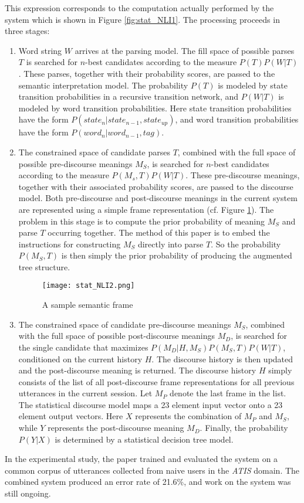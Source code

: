 This expression corresponds to the computation actually performed by the system which is shown in Figure \ref{fig:stat_NLI1}. The processing proceeds in three stages:
\begin{enumerate}
\item Word string $W$ arrives at the parsing model. The fill space of possible parses $T$ is searched for $n$-best candidates according to the measure $P(T)P(W|T)$. These parses, together with their probability scores, are passed to the semantic interpretation model. The probability $P(T)$ is modeled by state transition probabilities in a recursive transition network, and $P(W|T)$ is modeled by word transition probabilities. Here state transition probabilities have the form $P(state_n | state_{n-1}, state_{up})$, and word transition probabilities have the form $P(word_n | word_{n-1}, tag)$.
\item The constrained space of candidate parses $T$, combined with the full space of possible pre-discourse meanings $M_S$, is searched for $n$-best candidates according to the measure $P(M_s, T)P(W|T)$. These pre-discourse meanings, together with their associated probability scores, are passed to the discourse model. Both pre-discourse and post-discourse meanings in the current system are represented using a simple frame representation (cf. Figure \ref{fig:stat_NLI2}). The problem in this stage is to compute the prior probability of meaning $M_S$ and parse $T$ occurring together. The method of this paper is to embed the instructions for constructing $M_S$ directly into parse $T$. So the probability $P(M_S, T)$ is then simply the prior probability of producing the augmented tree structure.
    \begin{figure}[h]
      \centering
      \texttt{[image: stat\_NLI2.png]}\\
      \caption{A sample semantic frame}\label{fig:stat_NLI2}
    \end{figure}
\item The constrained space of candidate pre-discourse meanings $M_S$, combined with the full space of possible post-discourse meanings $M_D$, is searched for the single candidate that maximizes $P(M_D | H, M_S)P(M_S, T)P(W|T)$, conditioned on the current history $H$. The discourse history is then updated and the post-discourse meaning is returned. The discourse history $H$ simply consists of the list of all post-discourse frame representations for all previous utterances in the current session. Let $M_P$ denote the last frame in the list. The statistical discourse model maps a 23 element input vector onto a 23 element output vectors. Here $X$ represents the combination of $M_P$ and $M_S$, while $Y$ represents the post-discourse meaning $M_D$. Finally, the probability $P(Y | X)$ is determined by a statistical decision tree model.
\end{enumerate}

In the experimental study, the paper trained and evaluated the system on a common corpus of utterances collected from naive users in the \emph{ATIS} domain. The combined system produced an error rate of 21.6\%, and work on the system was still ongoing. 